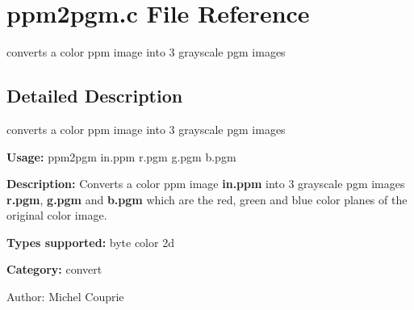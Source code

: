 \section{ppm2pgm.c File Reference}
\label{ppm2pgm_8c}
converts a color ppm image into 3 grayscale pgm images 



\subsection{Detailed Description}
converts a color ppm image into 3 grayscale pgm images 

{\bf Usage:} ppm2pgm in.ppm r.pgm g.pgm b.pgm

{\bf Description:} Converts a color ppm image {\bf in.ppm} into 3 grayscale pgm images {\bf r.pgm}, {\bf g.pgm} and {\bf b.pgm} which are the red, green and blue color planes of the original color image.

{\bf Types supported:} byte color 2d

{\bf Category:} convert

\begin{Desc}
\item[Author:]Michel Couprie \end{Desc}
